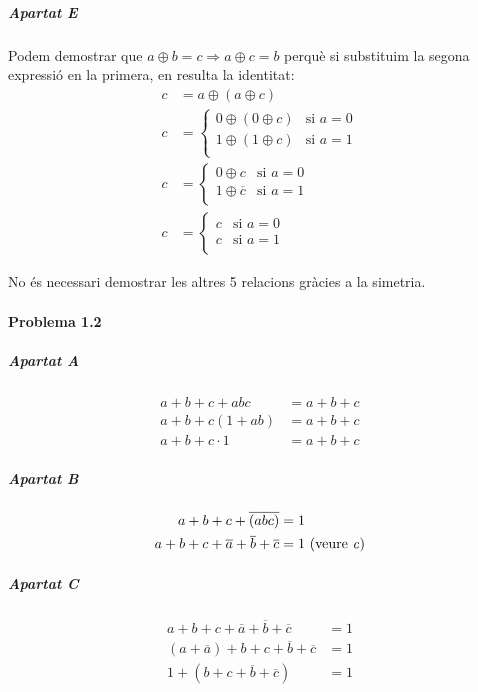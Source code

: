 \subparagraph{Apartat E} Podem demostrar que $a \oplus b = c \Rightarrow a \oplus c = b$ perquè si substituim la segona expressió en la primera, en resulta la identitat:
%
\begin{align*}
  c &= a \oplus \left(a \oplus c\right) \\
  c &= \begin{cases}
    0 \oplus \left(0 \oplus c\right) & \text{si $a = 0$} \\
    1 \oplus \left(1 \oplus c\right) & \text{si $a = 1$} \\
  \end{cases} \\
  c &= \begin{cases}
    0 \oplus c & \text{si $a = 0$} \\
    1 \oplus \overline{c} & \text{si $a = 1$} \\
  \end{cases} \\
  c &= \begin{cases}
    c & \text{si $a = 0$} \\
    c & \text{si $a = 1$} \\
  \end{cases}
\end{align*}

No és necessari demostrar les altres 5 relacions gràcies a la simetria.

\finishpage

\page
\paragraph{Problema 1.2}

\subparagraph{Apartat A} \begin{align*}
  a + b + c + abc &= a + b + c \\
  a + b + c\left(1 + ab\right) &= a + b + c \\
  a + b + c \cdot 1 &= a + b + c
\end{align*}

\subparagraph{Apartat B} \begin{align*}
  a + b + c + \overline{\left(abc\right)} &= 1 \\
  a + b + c + \overline{a} + \overline{b} + \overline{c} &= 1 \,\, \text{(veure \emph{c})}
\end{align*}

\subparagraph{Apartat C} \begin{align*}
  a + b + c + \overline{a} + \overline{b} + \overline{c} &= 1 \\
  \left(a + \overline{a}\right) + b + c + \overline{b} + \overline{c} &= 1 \\
  1 + \left(b + c + \overline{b} + \overline{c}\right) &= 1
\end{align*}

